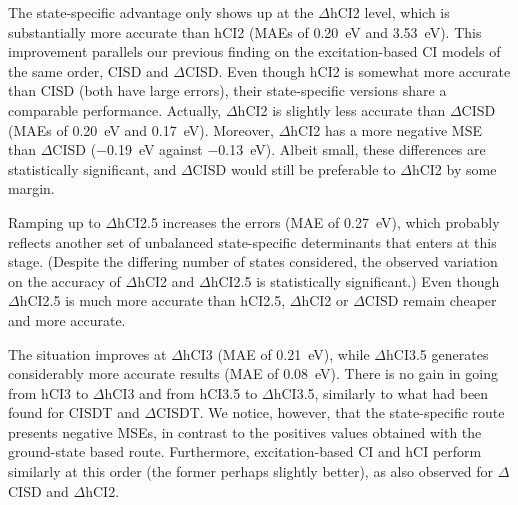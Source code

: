 \documentclass[aip,jcp,reprint,noshowkeys,superscriptaddress]{revtex4-1}
\begin{document}


The state-specific advantage only shows up at the $\Delta$hCI2 level, which is substantially more accurate than hCI2 (MAEs of \SI{0.20}{\eV} and \SI{3.53}{\eV}).
This improvement parallels our previous finding on the excitation-based CI models of the same order, CISD and $\Delta$CISD. \cite{Kossoski_2023}
Even though hCI2 is somewhat more accurate than CISD (both have large errors), their state-specific versions share a comparable performance.
Actually, $\Delta$hCI2 is slightly less accurate than $\Delta$CISD (MAEs of \SI{0.20}{\eV} and \SI{0.17}{\eV}).
Moreover, $\Delta$hCI2 has a more negative MSE than $\Delta$CISD (\SI{-0.19}{\eV} against \SI{-0.13}{\eV}).
Albeit small, these differences are statistically significant, and $\Delta$CISD would still be preferable to $\Delta$hCI2 by some margin.

Ramping up to $\Delta$hCI2.5 increases the errors (MAE of \SI{0.27}{\eV}),
which probably reflects another set of unbalanced state-specific determinants that enters at this stage.
(Despite the differing number of states considered, the observed variation on the accuracy of $\Delta$hCI2 and $\Delta$hCI2.5 is statistically significant.)
Even though $\Delta$hCI2.5 is much more accurate than hCI2.5, $\Delta$hCI2 or $\Delta$CISD remain cheaper and more accurate.

The situation improves at $\Delta$hCI3 (MAE of \SI{0.21}{\eV}),
while $\Delta$hCI3.5 generates considerably more accurate results (MAE of \SI{0.08}{\eV}).
There is no gain in going from hCI3 to $\Delta$hCI3 and from hCI3.5 to $\Delta$hCI3.5,
similarly to what had been found for CISDT and $\Delta$CISDT. \cite{Kossoski_2023}
We notice, however, that the state-specific route presents negative MSEs, in contrast to the positives values obtained with the ground-state based route.
Furthermore, excitation-based CI and hCI perform similarly at this order (the former perhaps slightly better),
as also observed for $\Delta$CISD and $\Delta$hCI2.
\end{document}

